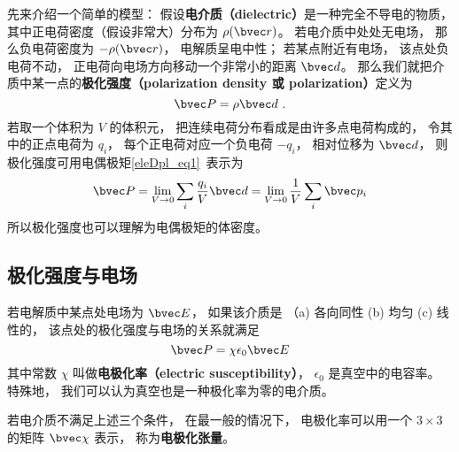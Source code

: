 

先来介绍一个简单的模型： 假设\textbf{电介质（dielectric）}是一种完全不导电的物质， 其中正电荷密度（假设非常大）分布为 $\rho(\bvec r)$。 若电介质中处处无电场， 那么负电荷密度为 $-\rho(\bvec r)$， 电解质呈电中性； 若某点附近有电场， 该点处负电荷不动， 正电荷向电场方向移动一个非常小的距离 $\bvec d$。 那么我们就把介质中某一点的\textbf{极化强度（polarization density 或 polarization）}定义为
\begin{equation}
\bvec P = \rho \bvec d~.
\end{equation}
若取一个体积为 $V$ 的体积元， 把连续电荷分布看成是由许多点电荷构成的， 令其中的正点电荷为 $q_i$， 每个正电荷对应一个负电荷 $-q_i$， 相对位移为 $\bvec d$， 则极化强度可用电偶极矩\autoref{eleDpl_eq1}~表示为
\begin{equation}
\bvec P = \lim_{V\to 0}\sum_i \frac{q_i}{V} \bvec d = \lim_{V\to 0}\frac{1}{V} \sum_i \bvec p_i
\end{equation}
所以极化强度也可以理解为电偶极矩的体密度。

\subsection{极化强度与电场}
若电解质中某点处电场为 $\bvec E$， 如果该介质是 （a) 各向同性 (b) 均匀 (c) 线性的， 该点处的极化强度与电场的关系就满足
\begin{equation}
\bvec P = \chi \epsilon_0 \bvec E
\end{equation}
其中常数 $\chi$ 叫做\textbf{电极化率（electric susceptibility）}， $\epsilon_0$ 是真空中的电容率。 %
特殊地， 我们可以认为真空也是一种极化率为零的电介质。

若电介质不满足上述三个条件， 在最一般的情况下， 电极化率可以用一个 $3\times 3$ 的矩阵 $\bvec \chi$ 表示， 称为\textbf{电极化张量}。 %
